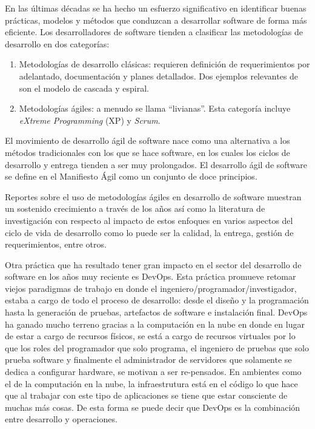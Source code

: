 En las últimas décadas se ha hecho un esfuerzo significativo en identificar buenas prácticas, modelos y métodos que conduzcan a desarrollar software de forma más eficiente. Los desarrolladores de software tienden a clasificar las metodologías de desarrollo en dos categorías\cite{li-jian-armin-eberlein}:
\begin{enumerate}
    \item Metodologías de desarrollo clásicas: requieren definición de requerimientos por adelantado, documentación y planes detallados. Dos ejemplos relevantes de son el modelo de cascada y espiral.
    \item Metodologías ágiles: a menudo se llama ``livianas''. Esta categoría incluye \emph{eXtreme Programming} (XP) y \emph{Scrum}.
\end{enumerate}

El movimiento de desarrollo ágil de software nace como una alternativa a los métodos tradicionales con los que se hace software, en los cuales los ciclos de desarrollo y entrega tienden a ser muy  prolongados. El desarrollo ágil de software se define en el Manifiesto Ágil \cite{agile-manifesto} como un conjunto de doce principios. 

Reportes sobre el uso de metodologías ágiles en desarrollo de software muestran un sostenido crecimiento a través de los años\cite{version-one} así como la literatura de investigación con respecto al impacto de estos enfoques en varios aspectos del ciclo de vida de desarrollo como lo puede ser la calidad, la entrega, gestión de requerimientos, entre otros. 

Otra práctica que ha resultado tener gran impacto en el sector del desarrollo de software en los años muy reciente es DevOps. Esta práctica promueve retomar viejos paradigmas de trabajo en donde el ingeniero/programador/investigador, estaba a cargo de todo el proceso de desarrollo: desde el diseño y la programación hasta la generación de pruebas, artefactos de software e instalación final. DevOps ha ganado mucho terreno gracias a la computación en la nube en donde en lugar de estar a cargo de recursos físicos, se está a cargo de recursos virtuales por lo que los roles del programador que solo programa, el ingeniero de pruebas que solo prueba software y finalmente el administrador de servidores que solamente se dedica a configurar hardware, se motivan a ser re-pensados. En ambientes como el de la computación en la nube, la infraestrutura está en el código lo que hace que al trabajar con este tipo de aplicaciones se tiene que estar consciente de muchas más cosas. De esta forma se puede decir que DevOps es la combinación entre desarrollo y operaciones. 

